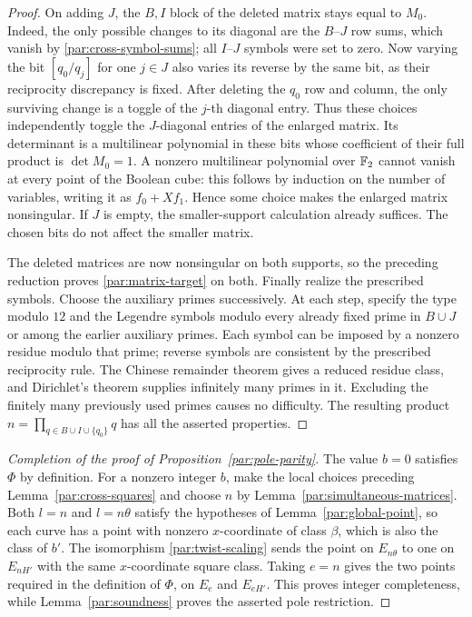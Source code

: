 \begin{proof}
On adding $J$, the $B,I$ block of the deleted matrix stays equal to
$M_0$. Indeed, the only possible changes to its diagonal are the
$B$--$J$ row sums, which vanish by \eqref{par:cross-symbol-sums}; all
$I$--$J$ symbols were set to zero. Now varying the bit $[q_0/q_j]$ for
one $j\in J$ also varies its reverse by the same bit, as their
reciprocity discrepancy is fixed. After deleting the $q_0$ row and
column, the only surviving change is a toggle of the $j$-th diagonal
entry. Thus these choices independently toggle the $J$-diagonal entries
of the enlarged matrix. Its determinant is a multilinear polynomial
in these bits whose coefficient of their full product is $\det M_0=1$.
A nonzero multilinear polynomial over $\mathbb F_2$ cannot vanish at every
point of the Boolean cube: this follows by induction on the number of
variables, writing it as $f_0+Xf_1$. Hence some choice makes the enlarged
matrix nonsingular. If $J$ is empty, the smaller-support calculation
already suffices. The chosen bits do not affect the smaller matrix.

The deleted matrices are now nonsingular on both supports, so the
preceding reduction proves \eqref{par:matrix-target} on both.
Finally realize the prescribed symbols. Choose the auxiliary primes
successively. At each step, specify the type modulo $12$ and the
Legendre symbols modulo every already fixed prime in $B\cup J$
or among the earlier auxiliary primes. Each symbol can be imposed
by a nonzero residue modulo that prime; reverse symbols are
consistent by the prescribed reciprocity rule. The Chinese
remainder theorem gives a reduced residue class, and Dirichlet's
theorem supplies infinitely many primes in it. Excluding the
finitely many previously used primes causes no difficulty.
The resulting product
$n=\prod_{q\in B\cup I\cup\{q_0\}}q$ has all the asserted
properties.
\end{proof}

\begin{proof}[Completion of the proof of Proposition~\ref{par:pole-parity}]
The value $b=0$ satisfies $\Phi$ by definition. For a nonzero integer
$b$, make the local choices preceding Lemma~\ref{par:cross-squares} and choose
$n$ by Lemma~\ref{par:simultaneous-matrices}. Both $l=n$ and
$l=n\theta$ satisfy the hypotheses of Lemma~\ref{par:global-point}, so
each curve has a point with nonzero $x$-coordinate of class $\beta$,
which is also the class of $b'$. The isomorphism
\eqref{par:twist-scaling} sends the point on $E_{n\theta}$ to one on
$E_{nH'}$ with the same $x$-coordinate square class. Taking $e=n$
gives the two points required in the definition of $\Phi$, on $E_e$
and $E_{eH'}$. This proves integer completeness, while
Lemma~\ref{par:soundness} proves the asserted pole restriction.
\end{proof}
